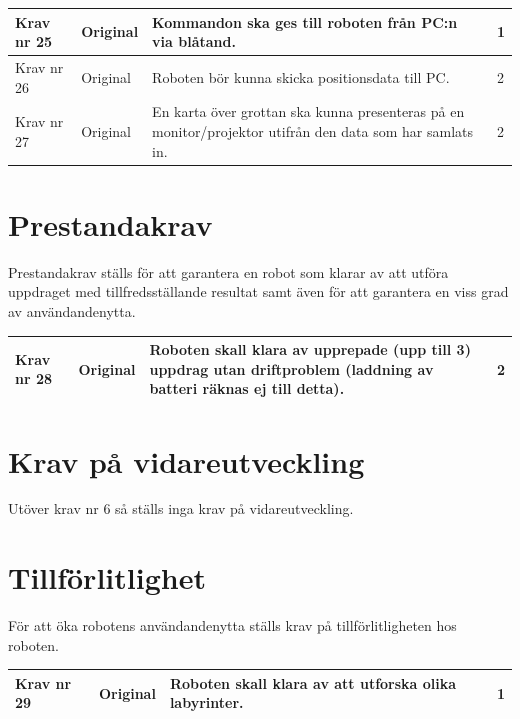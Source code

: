 \documentclass[11pt]{article}
\begin{document}
\begin{flushleft}
\begin{center}
\begin{longtable}{|l|l|p{.70\linewidth}|l|}
Krav nr 25 &
Original &
Kommandon ska ges till roboten från PC:n via blåtand. &
1 \\ \hline

Krav nr 26 &
Original &
Roboten bör kunna skicka positionsdata till PC. &
2 \\ \hline

Krav nr 27 &
Original &
En karta över grottan ska kunna presenteras på en monitor/projektor utifrån den data som har samlats in. &
2 \\ \hline
\end{longtable}
\end{center}


\section{Prestandakrav}
Prestandakrav ställs för att garantera en robot som klarar av att utföra uppdraget med tillfredsställande resultat samt även för att garantera en viss grad av användandenytta.

\begin{center}
\begin{longtable}{|l|l|p{.70\linewidth}|l|} \hline

Krav nr 28 &
Original &
Roboten skall klara av upprepade (upp till 3) uppdrag utan driftproblem (laddning av batteri räknas ej till detta). &
2 \\ \hline

\end{longtable}
\end{center}

\pagebreak

\section{Krav på vidareutveckling}
Utöver krav nr 6 så ställs inga krav på vidareutveckling.

\section{Tillförlitlighet}
För att öka robotens användandenytta ställs krav på tillförlitligheten hos roboten.

\begin{center}
\begin{longtable}{|l|l|p{.70\linewidth}|l|} \hline

Krav nr 29 &
Original &
Roboten skall klara av att utforska olika labyrinter. &
1 \\ \hline


\end{longtable}
\end{center}
\end{flushleft}
\end{document}
